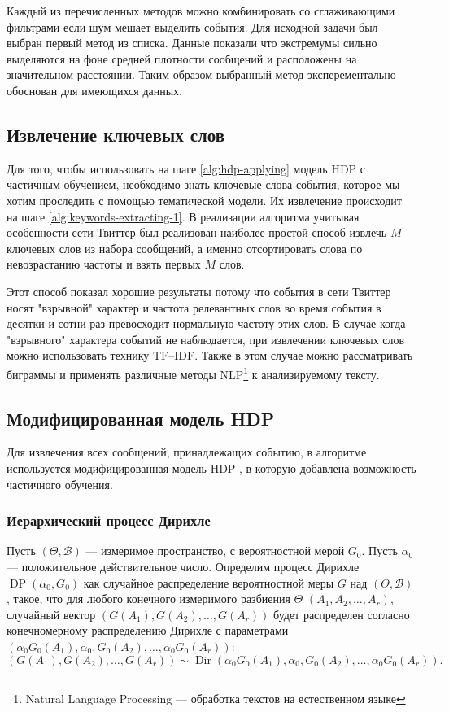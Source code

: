 \documentclass[12pt, a4paper]{article}
\DeclareMathOperator{\Dir}{Dir}
\DeclareMathOperator{\DP}{DP}
\begin{document}
  Каждый из перечисленных методов можно комбинировать со сглаживающими фильтрами если шум мешает выделить события.
  Для исходной задачи был выбран первый метод из списка. Данные показали что экстремумы сильно выделяются на фоне средней плотности сообщений и расположены на значительном расстоянии. Таким образом выбранный метод эксперементально обоснован для имеющихся данных.
  
  \subsection{Извлечение ключевых слов}
  Для того, чтобы использовать на шаге \ref{alg:hdp-applying} модель HDP с частичным обучением, необходимо знать ключевые слова события, которое мы хотим проследить с помощью тематической модели. Их извлечение происходит на шаге \ref{alg:keywords-extracting-1}. В реализации алгоритма учитывая особенности сети Твиттер был реализован наиболее простой способ извлечь $M$ ключевых слов из набора сообщений, а именно отсортировать слова по невозрастанию частоты и взять первых $M$ слов.
  
  Этот способ показал хорошие результаты потому что события в сети Твиттер носят "взрывной" характер и частота релевантных слов во время события в десятки и сотни раз превосходит нормальную частоту этих слов. В случае когда "взрывного" характера событий не наблюдается, при извлечении ключевых слов можно использовать технику TF--IDF. Также в этом случае можно рассматривать биграммы и применять различные методы NLP\footnote{Natural Language Processing --- обработка текстов на естественном языке} к анализируемому тексту.
  
  \subsection{Модифицированная модель HDP}
  Для извлечения всех сообщений, принадлежащих событию, в алгоритме используется модифицированная модель HDP , в которую добавлена возможность частичного обучения.
  
  \subsubsection{Иерархический процесс Дирихле}
  Пусть $(\Theta, \mathcal{B})$ --- измеримое пространство, с вероятностной мерой $G_0$. Пусть $\alpha_0$ --- положительное действительное число. Определим процесс Дирихле $\DP(\alpha_0, G_0)$ как случайное распределение вероятностной меры $G$ над $(\Theta, \mathcal{B})$, такое, что для любого конечного измеримого разбиения $\Theta$ $(A_1, A_2, \ldots, A_r)$, случайный вектор $(G(A_1), G(A_2), \ldots, G(A_r))$ будет распределен согласно конечномерному распределению Дирихле с параметрами $(\alpha_0 G_0(A_1), \alpha_0, G_0(A_2), \ldots, \alpha_0 G_0 (A_r))$:
  \begin{equation}
  (G(A_1), G(A_2), \ldots, G(A_r)) \sim \Dir(\alpha_0 G_0(A_1), \alpha_0, G_0(A_2), \ldots, \alpha_0 G_0 (A_r)).
  \end{equation}
  
\end{document}
